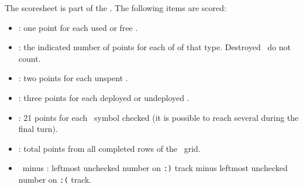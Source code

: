 The scoresheet is part of the \planetsheet.  The following items are scored:
\begin{itemize}
  \item \astronauts: one point for each used or free \astronaut.
  \item \armaments: the indicated number of points for each of \armament of that type. Destroyed \armaments\ do not count.
  \item \currency: two points for each unspent \currency.
  \item \squadrons: three points for each deployed or undeployed \squadron.
  \item \mastery: 21 points for each \masterysymbol\ symbol checked (it is possible to reach several during the final turn).
  \item \culture: total points from all completed rows of the \culture\ grid.
  \item \happiness\ minus \unhappiness: leftmost unchecked number on \texttt{:)} track minus leftmost unchecked number on \texttt{:(} track.
\end{itemize}
